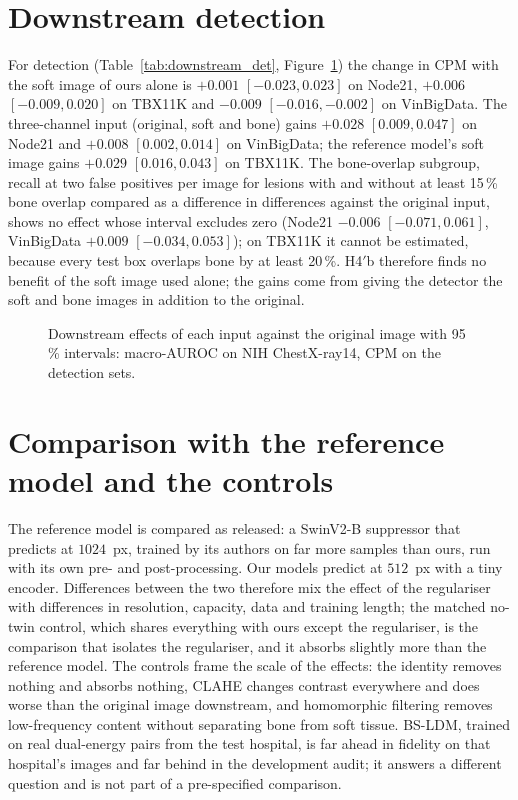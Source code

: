 \section{Downstream detection}
For detection (Table~\ref{tab:downstream_det}, Figure~\ref{fig:downstream_forest}) the change in CPM with the soft image of ours alone is
$+0.001$ $[-0.023,0.023]$ on Node21, $+0.006$ $[-0.009,0.020]$ on TBX11K and $-0.009$ $[-0.016,-0.002]$ on VinBigData. The three-channel input
(original, soft and bone) gains $+0.028$ $[0.009,0.047]$ on Node21 and $+0.008$ $[0.002,0.014]$ on VinBigData; the reference model's soft image
gains $+0.029$ $[0.016,0.043]$ on TBX11K. The bone-overlap subgroup, recall at two false positives per image for lesions with and without at
least 15\,\% bone overlap compared as a difference in differences against the original input, shows no effect whose interval excludes zero
(Node21 $-0.006$ $[-0.071,0.061]$, VinBigData $+0.009$ $[-0.034,0.053]$); on TBX11K it cannot be estimated, because every test box overlaps bone
by at least 20\,\%. H4$'$b therefore finds no benefit of the soft image used alone; the gains come from giving the detector the soft and bone
images in addition to the original.
\begin{table}[htbp]
\centering\small
\caption{Downstream detection on Node21, TBX11K and VinBigData: CPM and mAP@50 (mean $\pm$ SD over three seeds), differences to the original
image and the difference in differences (DiD) of recall at two false positives per image (image bootstrap).}
\label{tab:downstream_det}
\end{table}
\begin{figure}[htbp]
\centering
{}
\caption{Downstream effects of each input against the original image with 95\,\% intervals: macro-AUROC on NIH ChestX-ray14, CPM on the
detection sets.}
\label{fig:downstream_forest}
\end{figure}

\section{Comparison with the reference model and the controls}
The reference model is compared as released: a SwinV2-B suppressor that predicts at $1024$~px, trained by its authors on far more samples than
ours, run with its own pre- and post-processing. Our models predict at $512$~px with a tiny encoder. Differences between the two therefore mix
the effect of the regulariser with differences in resolution, capacity, data and training length; the matched no-twin control, which shares
everything with ours except the regulariser, is the comparison that isolates the regulariser, and it absorbs slightly more than the reference
model. The controls frame the scale of the effects: the identity removes nothing and absorbs nothing, CLAHE changes contrast everywhere and
does worse than the original image downstream, and homomorphic filtering removes low-frequency content without separating bone from soft
tissue. BS-LDM, trained on real dual-energy pairs from the test hospital, is far ahead in fidelity on that hospital's images and far behind
in the development audit; it answers a different question and is not part of a pre-specified comparison.
